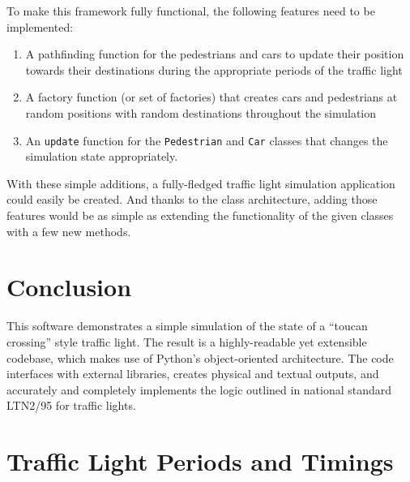 \documentclass[
  letterpaper,
  DIV=11,
  numbers=noendperiod]{scrartcl}
\providecommand{\tightlist}{%
  \setlength{\itemsep}{0pt}\setlength{\parskip}{0pt}}\usepackage{longtable,booktabs,array}
\begin{document}
To make this framework fully functional, the following features need to
be implemented:

\begin{enumerate}
\def\labelenumi{\arabic{enumi}.}
\tightlist
\item
  A pathfinding function for the pedestrians and cars to update their
  position towards their destinations during the appropriate periods of
  the traffic light
\item
  A factory function (or set of factories) that creates cars and
  pedestrians at random positions with random destinations throughout
  the simulation
\item
  An \texttt{update} function for the \texttt{Pedestrian} and
  \texttt{Car} classes that changes the simulation state appropriately.
\end{enumerate}

With these simple additions, a fully-fledged traffic light simulation
application could easily be created. And thanks to the class
architecture, adding those features would be as simple as extending the
functionality of the given classes with a few new methods.

\hypertarget{conclusion}{%
\section{Conclusion}\label{conclusion}}

This software demonstrates a simple simulation of the state of a
``toucan crossing'' style traffic light. The result is a highly-readable
yet extensible codebase, which makes use of Python's object-oriented
architecture. The code interfaces with external libraries, creates
physical and textual outputs, and accurately and completely implements
the logic outlined in national standard LTN2/95 for traffic lights.

\clearpage

\appendix

\hypertarget{traffic-light-periods-and-timings}{%
\section{Traffic Light Periods and
Timings}\label{traffic-light-periods-and-timings}}
\end{document}
